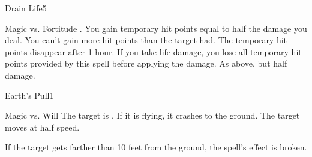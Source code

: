 \begin{spellsection}{Drain Life}{5}
    \begin{spellheader}
    \end{spellheader}
    \begin{spellcontent}
        \begin{spelltargetinginfo}
        \end{spelltargetinginfo}
        \begin{spelleffects}
            \begin{spellattack}{Magic vs. Fortitude}
                \spellsuccess {}. You gain temporary hit points equal to half the damage you deal. You can't gain more hit points than the target had. The temporary hit points disappear after 1 hour. If you take life damage, you lose all temporary hit points provided by this spell before applying the damage.
                \spellfailure As above, but half damage.
            \end{spellattack}
            \spelldur \durlong
        \end{spelleffects}
    \end{spellcontent}
    \begin{spellfooter}
        \miscastrandom
    \end{spellfooter}
\end{spellsection}


\begin{spellsection}{Earth's Pull}{1}
    \begin{spellheader}
    \end{spellheader}
    \begin{spellcontent}
        \begin{spelltargetinginfo}
            \spellrng{\rngclose}
        \end{spelltargetinginfo}
        \begin{spelleffects}
            \begin{spellattack}{Magic vs. Will}
                \spellsuccess The target is \immobilized. If it is flying, it crashes to the ground.
                \spellfailure The target moves at half speed.
            \end{spellattack}
            \spelldur \durshort
        \end{spelleffects}
    \end{spellcontent}
    \begin{spellfooter}
        \spellnotes If the target gets farther than 10 feet from the ground, the spell's effect is broken.
        \miscastrandom
    \end{spellfooter}
\end{spellsection}

